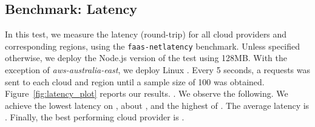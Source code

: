 \subsection{Benchmark: Latency}
In this test, we measure the latency (round-trip) for all cloud providers and corresponding regions, using the \texttt{faas-netlatency} benchmark.
Unless specified otherwise, we deploy the Node.js version of the test using 128\gls{MB}.
With the exception of \textit{aws-australia-east}, we deploy Linux .   
Every 5 seconds, a requests was sent to each cloud and region until a sample size of 100 was obtained. 
Figure~\ref{fig:latency_plot} reports our results. 
.
We observe the following.
We achieve the lowest latency on , about , and the highest of . 
The average latency is .
Finally, the best performing cloud provider is .

